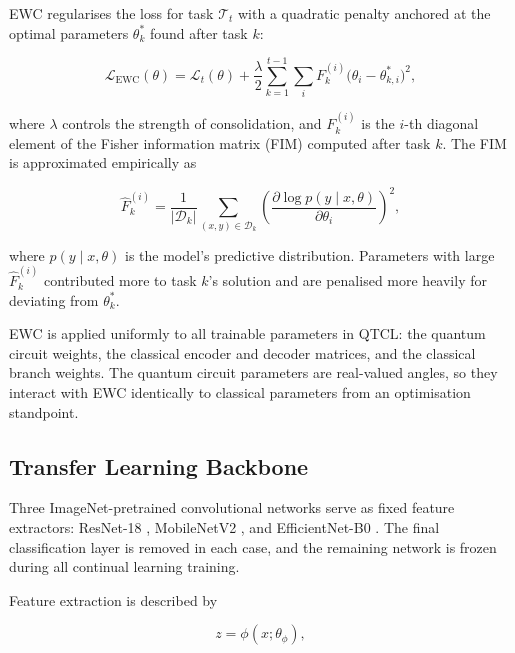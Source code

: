 \documentclass[acmlarge]{acmart}
\begin{document}
EWC \cite{Kirkpatrick2017} regularises the loss for task $\mathcal{T}_t$ with a quadratic penalty anchored at the optimal parameters $\theta^*_k$ found after task $k$:

\begin{equation}
\label{eq:ewc_loss}
\mathcal{L}_{\text{EWC}}(\theta) = \mathcal{L}_t(\theta) + \frac{\lambda}{2} \sum_{k=1}^{t-1} \sum_i F_k^{(i)} \bigl(\theta_i - \theta_{k,i}^*\bigr)^2,
\end{equation}

where $\lambda$ controls the strength of consolidation, and $F_k^{(i)}$ is the $i$-th diagonal element of the Fisher information matrix (FIM) computed after task $k$.
The FIM is approximated empirically as

\begin{equation}
\label{eq:fisher}
\hat{F}_k^{(i)} = \frac{1}{|\mathcal{D}_k|} \sum_{(x,y) \in \mathcal{D}_k} \left( \frac{\partial \log p(y \mid x, \theta)}{\partial \theta_i} \right)^2,
\end{equation}

where $p(y \mid x, \theta)$ is the model's predictive distribution.
Parameters with large $\hat{F}_k^{(i)}$ contributed more to task $k$'s solution and are penalised more heavily for deviating from $\theta^*_k$.

EWC is applied uniformly to all trainable parameters in QTCL: the quantum circuit weights, the classical encoder and decoder matrices, and the classical branch weights.
The quantum circuit parameters are real-valued angles, so they interact with EWC identically to classical parameters from an optimisation standpoint.

\subsection{Transfer Learning Backbone}
\label{subsec:backbone}

Three ImageNet-pretrained convolutional networks serve as fixed feature extractors: ResNet-18 \cite{He2016}, MobileNetV2 \cite{Sandler2018}, and EfficientNet-B0 \cite{Tan2019}.
The final classification layer is removed in each case, and the remaining network is frozen during all continual learning training.

Feature extraction is described by

\begin{equation}
\label{eq:feature_extractor}
z = \phi(x; \theta_\phi),
\end{equation}
\end{document}
